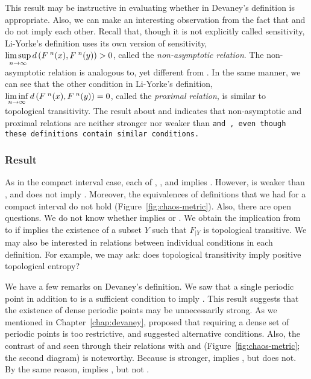 \documentclass[10pt,twoside,draft]{book}
\begin{document}
This result may be instructive in evaluating whether \dpp in Devaney's definition is appropriate.
Also, we can make an interesting observation from the fact that \wig and \liy do not imply each other. 
Recall that, though it is not explicitly called sensitivity, Li-Yorke's definition uses its own version of sensitivity, $\limsup\limits_{n\to \infty} d\left( F^{\;n}(x), F^{\;n}(y) \right) > 0$, called the \textit{non-asymptotic relation}.
The non-asymptotic relation is analogous to, yet different from \sdic.
In the same manner, we can see that the other condition in Li-Yorke's definition, $\liminf\limits_{n\to \infty} d\left( F^{\;n}(x), F^{\;n}(y) \right) = 0$, called the \textit{proximal relation}, is similar to topological transitivity.
The result about \wig and \liy indicates that non-asymptotic and proximal relations are neither stronger nor weaker than \tt and \sdic, even though these definitions contain similar conditions.

\subsubsection*{Result}
As in the compact interval case, each of \dev, \blcp, and \pte implies \liy.
However, \wig is weaker than \dev, and does not imply \liy.
Moreover, the equivalences of definitions that we had for a compact interval do not hold (Figure~\ref{fig:chaos-metric}).
Also, there are open questions.
We do not know whether \pte implies \blcp or \dev.
We obtain the implication from \pte to \wig if \pte implies the existence of a subset $Y$ such that $F_{|Y}$ is topological transitive.
We may also be interested in relations between individual conditions in each definition.
For example, we may ask: does topological transitivity imply positive topological entropy?

We have a few remarks on Devaney's definition.
We saw that a single periodic point in addition to \wig is a sufficient condition to imply \liy. 
This result suggests that the existence of dense periodic points may be unnecessarily strong.
As we mentioned in Chapter~\ref{chap:devaney}, \citet{glasner} proposed that requiring a dense set of periodic points is too restrictive, and suggested alternative conditions.
Also, the contrast of \dev and \wig seen through their relations with \pte and \liy (Figure~\ref{fig:chaos-metric}; the second diagram) is noteworthy.
Because \dev is stronger, \dev implies \liy, but \wig does not.
By the same reason, \blcp implies \wig, but not \dev.



\end{document}
